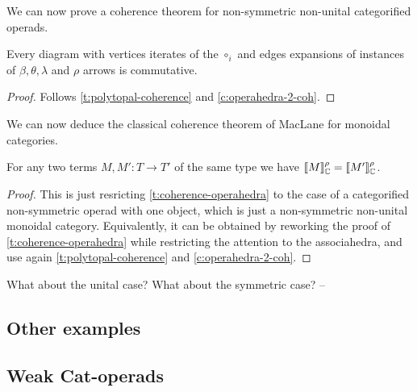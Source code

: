 
We can now prove a coherence theorem for non-symmetric non-unital categorified operads. 

\begin{thm}
\label{t:coherence-operahedra}
    Every diagram with vertices iterates of the $\circ_i$ and edges expansions of instances of $\beta, \theta, \lambda$ and $\rho$ arrows is commutative. 
\end{thm}

\begin{proof}
    Follows \cref{t:polytopal-coherence} and \cref{c:operahedra-2-coh}.
\end{proof}

We can now deduce the classical coherence theorem of MacLane for monoidal categories. 

\begin{corollary}
    For any two terms $M,M':T\rightarrow T'$  of the same type we have $[\![ M]\!]^\rho_{{\mathbb C}}=[\![ M']\!]^\rho_{{\mathbb C}}$.
\end{corollary}

\begin{proof}
    This is just resricting \cref{t:coherence-operahedra} to the case of a categorified non-symmetric operad with one object, which is just a non-symmetric non-unital monoidal category. 
    Equivalently, it can be obtained by reworking the proof of \cref{t:coherence-operahedra} while restricting the attention to the associahedra, and use again \cref{t:polytopal-coherence} and \cref{c:operahedra-2-coh}.
\end{proof}

\begin{rem}
    What about the unital case? 
    What about the symmetric case? --
\end{rem}


\subsection{Other examples}

\subsection{Weak Cat-operads}


